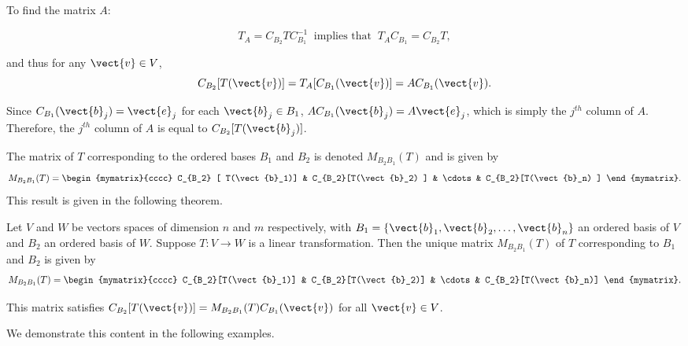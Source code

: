 To find the matrix $A$:

\[ T_A=C_{B_2}TC_{B_1}^{-1}~\mbox{ implies that }~
T_AC_{B_1}=C_{B_2}T,\]

and thus for any $\vect{v}\in V$, 
\[ C_{B_2}[T(\vect{v})] = T_A[C_{B_1}(\vect{v})] 
=AC_{B_1}(\vect{v}).\]

Since $C_{B_1}(\vect{b}_j)=\vect{e}_j$
for each $\vect{b}_j\in B_1$,
$AC_{B_1}(\vect{b}_j)=A\vect{e}_j$, which is simply the
$j^{th}$ column of $A$.
Therefore, the $j^{th}$ column of $A$ is equal to $C_{B_2}[T(\vect{b}_j)]$.

The matrix of $T$ corresponding to the ordered
bases $B_1$ and $B_2$ is denoted $ M_{B_2B_1}(T)$ and is given by 
\[ M_{B_2B_1}(T)=
\begin{mymatrix}{cccc}
C_{B_2} [ T(\vect{b}_1)] & C_{B_2}[T(\vect{b}_2) ] &
\cdots & C_{B_2}[T(\vect{b}_n) ] \end{mymatrix}.\] 
This result is given in the following theorem. 

\begin{theorem}{}{}
Let $V$ and $W$ be vectors spaces of dimension
$n$ and $m$ respectively, with $B_1=\{\vect{b}_1, \vect{b}_2, \ldots, \vect{b}_n\}$ an
ordered basis of $V$ and $B_2$ an ordered basis of $W$. Suppose $T:V\to W$ is a linear transformation. Then the unique matrix $M_{B_2B_1}(T)$ of $T$ corresponding to $B_1$ and $B_2$ is given by 
\[ M_{B_2B_1}(T)=
\begin{mymatrix}{cccc}
C_{B_2}[T(\vect{b}_1)] & C_{B_2}[T(\vect{b}_2)] &
\cdots & C_{B_2}[T(\vect{b}_n)] \end{mymatrix}.\]

This matrix satisfies  $C_{B_2}[T(\vect{v})]=M_{B_2B_1}(T)C_{B_1}(\vect{v})$ for all $\vect{v}\in V$.
\end{theorem}

We demonstrate this content in the following examples. 

